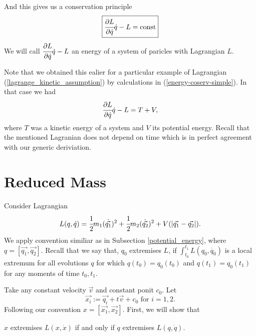 \documentclass[main.tex]{subfiles}
\begin{document}
And this gives us a conservation principle
\begin{equation}
\boxed{
\cfrac{\partial L}{\partial \dot{q}}\dot{q} - L = \text{const}
}
\end{equation}
We will call $\cfrac{\partial L}{\partial \dot{q}}\dot{q} - L$ an energy of a system of paricles with Lagrangian $L$.

Note that we obtained this ealier for a particular example of Lagrangian (\ref{lagrange_kinetic_assumption})
by calculations in (\ref{energy-coserv-simple}). In that case we had
\begin{equation}
\cfrac{\partial L}{\partial \dot{q}}\dot{q} - L = T + V,
\end{equation}
where $T$ was a kinetic energy of a system and $V$ its potential energy.
Recall that the mentioned Lagranian does not depend on time which is in perfect agreement with our generic deriviation.
\section{Reduced Mass}
Consider Lagrangian
\begin{equation}
\label{lagrangian-dist-dependent}
L(q, \dot{q}) = \cfrac{1}{2}m_1 (\dot{\vec{q_1}})^2 + \cfrac{1}{2}m_2 (\dot{\vec{q_2}})^2 + V(|\vec{q_1} - \vec{q_2}|).
\end{equation}
We apply convention similiar as in Subsection \ref{potential_energy}, where $q=[\vec{q_1}, \vec{q_2}]$.
Recall that we say that, $q_0$ extremises $L$, if $\int_{t_0}^{t_1} L(q_0, \dot{q_0})$ is a local extremum for all evolutions $q$ for which $q(t_0) = q_0(t_0)$ and $q(t_1) = q_0(t_1)$ for any moments of time $t_0, t_1$.

Take any constant velocity $\vec{v}$ and constant ponit $c_0$. Let
\begin{equation}
\label{inertial-coordinates-change}
\vec{x_i} := \vec{q_i} + t\vec{v} + c_0 \text{ for } i=1,2.
\end{equation}
Following our convention $x=[\vec{x_1}, \vec{x_2}]$. First, we will show that 
\begin{fact}
$x$ extremises $L(x, \dot{x})$ if and only if $q$ extremises $L(q, \dot{q})$.
\end{fact}
\end{document}
